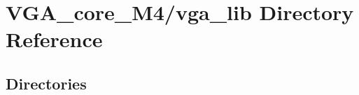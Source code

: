 \section{V\+G\+A\+\_\+core\+\_\+\+M4/vga\+\_\+lib Directory Reference}
\label{dir_2391b2017ee43478c60ba9104ef297cc}
\subsection*{Directories}
\begin{DoxyCompactItemize}
\end{DoxyCompactItemize}
